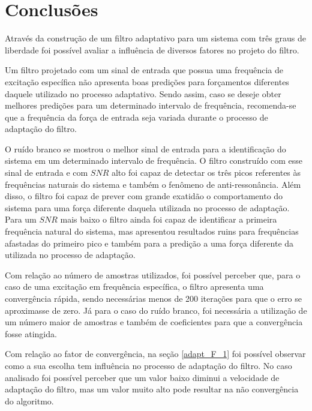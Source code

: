 \chapter{Conclusões}

Através da construção de um filtro adaptativo para um sistema com três graus de liberdade foi possível avaliar a influência de diversos fatores no projeto do filtro.

Um filtro projetado com um sinal de entrada que possua uma frequência de excitação específica não apresenta boas predições para forçamentos diferentes daquele utilizado no processo adaptativo. Sendo assim, caso se deseje obter melhores predições para um determinado intervalo de frequência, recomenda-se que a frequência da força de entrada seja variada durante o processo de adaptação do filtro.

O ruído branco se mostrou o melhor sinal de entrada para a identificação do sistema em um determinado intervalo de frequência. O filtro construído com esse sinal de entrada e com $ SNR $ alto foi capaz de detectar os três picos referentes às frequências naturais do sistema e também o fenômeno de anti-ressonância. Além disso, o filtro foi capaz de prever com grande exatidão o comportamento do sistema para uma força diferente daquela utilizada no processo de adaptação. Para um $ SNR $ mais baixo o filtro ainda foi capaz de identificar a primeira frequência natural do sistema, mas apresentou resultados ruins para frequências afastadas do primeiro pico e também para a predição a uma força diferente da utilizada no processo de adaptação.

Com relação ao número de amostras utilizados, foi possível perceber que, para o caso de uma excitação em frequência específica, o filtro apresenta uma convergência rápida, sendo necessárias menos de 200 iterações para que o erro se aproximasse de zero. Já para o caso do ruído branco, foi necessária a utilização de um número maior de amostras e também de coeficientes para que a convergência fosse atingida.

Com relação ao fator de convergência, na seção \ref{adapt_F_1} foi possível observar como a sua escolha tem influência no processo de adaptação do filtro. No caso analisado foi possível perceber que um valor baixo diminui a velocidade de adaptação do filtro, mas um valor muito alto pode resultar na não convergência do algoritmo.
